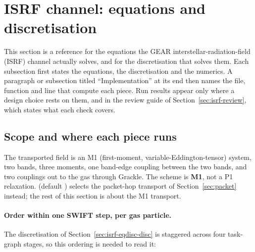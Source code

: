 \section{ISRF channel: equations and discretisation}
\label{sec:isrf-eqdisc}

This section is a reference for the equations the GEAR interstellar-radiation-field
(ISRF) channel actually solves, and for the discretisation that solves them. Each
subsection first states the equations, the discretisation and the numerics. A
paragraph or subsection titled ``Implementation'' at its end then names the file,
function and line that compute each piece. Run results appear only where a
design choice rests on them, and in the review guide of
Section~\ref{sec:isrf-review}, which states what each check covers.

\subsection{Scope and where each piece runs}
\label{sec:isrf-eqdisc-scope}

The transported field is an M1 (first-moment, variable-Eddington-tensor) system,
two bands, three moments, one band-edge coupling between the two bands, and two
couplings out to the gas through Grackle. The scheme is \textbf{M1}, not a P1
relaxation.
 (default ) selects the packet-hop
transport of Section~\ref{sec:packet} instead; the rest of this section is about
the M1 transport.

\paragraph{Order within one SWIFT step, per gas particle.} The discretisation of
Section~\ref{sec:isrf-eqdisc-disc} is staggered across four task-graph stages, so
this ordering is needed to read it:

